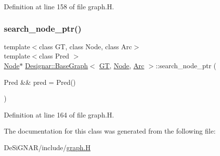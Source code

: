 Definition at line 158 of file graph.\+H.

\mbox{\label{class_designar_1_1_base_graph_a1f19e5a79bfa156fd4cd80f3d8e27aa4}} 
\subsubsection{\texorpdfstring{search\+\_\+node\+\_\+ptr()}{search\_node\_ptr()}\hspace{0.1cm}{\footnotesize\ttfamily [2/2]}}
{\footnotesize\ttfamily template$<$class GT, class Node, class Arc$>$ \\
template$<$class Pred $>$ \\
\hyperlink{namespace_designar_a5af326c65aa2bd26b26c410f2030d09e}{Node}$\ast$ \hyperlink{class_designar_1_1_base_graph}{Designar\+::\+Base\+Graph}$<$ \hyperlink{demo-buildgraph_8_c_a3001c40d2c31ca87ed96cd7d1334a55e}{GT}, \hyperlink{namespace_designar_a5af326c65aa2bd26b26c410f2030d09e}{Node}, \hyperlink{namespace_designar_a3f55fb5513d62ff47cbc8f72b8e95d6f}{Arc} $>$\+::search\+\_\+node\+\_\+ptr (\begin{DoxyParamCaption}\item[{Pred \&\&}]{pred = {\ttfamily Pred()} }\end{DoxyParamCaption})\hspace{0.3cm}{\ttfamily [inline]}}



Definition at line 164 of file graph.\+H.



The documentation for this class was generated from the following file\+:\begin{DoxyCompactItemize}
\item 
De\+Si\+G\+N\+A\+R/include/\hyperlink{graph_8_h}{graph.\+H}\end{DoxyCompactItemize}
